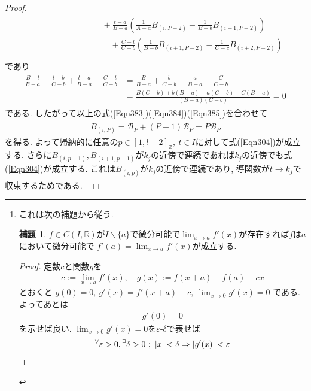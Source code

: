 \documentclass{jsarticle}
\newcommand\setZ{\mathbb{Z}}
\newcommand\Pare[1]{\left(#1\right)}
\newcommand\E[1]{\!\,{\vphantom{#1}}^\exists #1}
\newcommand\A[1]{\!\,{\vphantom{#1}}^\forall #1}
\theoremstyle{definition}%
\newtheorem*{lem*}{補題}
\begin{document}
\begin{proof}
\begin{align}
\begin{aligned}
			&\hspace{7em}\quad+\frac{t-a}{B-a}\Pare{\frac{1}{A-a}B_{(i,P-2)}-\frac{1}{B-b}B_{(i+1,P-2)}} \\
			&\hspace{7em}\qquad+\frac{C-t}{C-b}\Pare{\frac{1}{B-b}B_{(i+1,P-2)}-\frac{1}{C-c}B_{(i+2,P-2)}} \\
		\end{aligned}
	\end{align}
	であり
	\begin{align}
		\label{Eqn385}
		\begin{aligned}
			\frac{B-t}{B-a}-\frac{t-b}{C-b}+\frac{t-a}{B-a}-\frac{C-t}{C-b}
			&=\frac{B}{B-a}+\frac{b}{C-b}-\frac{a}{B-a}-\frac{C}{C-b} \\
			&=\frac{B(C-b)+b(B-a)-a(C-b)-C(B-a)}{(B-a)(C-b)}=0
		\end{aligned}
	\end{align}
	である.
	したがって以上の式(\ref{Eqn383})(\ref{Eqn384})(\ref{Eqn385})を合わせて
	\begin{align}
		\dot{B}_{(i,P)}=\mathcal{B}_P+(P-1)\mathcal{B}_P=P\mathcal{B}_P
	\end{align}
	を得る.
	よって帰納的に任意の${p}\in[1,l-2]_\setZ, \ {t} \in I$に対して式(\ref{Eqn304})が成立する.
	さらに$B_{(i,p-1)}, B_{(i+1,p-1)}$が$k_j$の近傍で連続であれば$k_j$の近傍でも式(\ref{Eqn304})が成立する.
	これは$B_{(i,p)}$が$k_j$の近傍で連続であり, 導関数が$t\to k_j$で収束するためである.%
	\footnote{これは次の補題から従う.
	\begin{lem*}
	    $f\in C(I,\mathbb{R})$が$I\backslash \{a\}$で微分可能で$\displaystyle\lim_{x\to a} f'(x)$が存在すれば$f$は$a$において微分可能で
	    $\displaystyle f'(a)=\lim_{x\to a}f'(x)$が成立する.
	\end{lem*}
	\begin{proof}
	    定数$c$と関数$g$を
	    \begin{align}
	        c:=\lim_{x\to a}f'(x),\quad
	        g(x):=f(x+a)-f(a)-cx
	    \end{align}
	    とおくと
	    $
	        \displaystyle
	        g(0)=0,\
	        g'(x)=f'(x+a)-c,\
	        \lim_{x \to 0} g'(x)=0
	    $
	    である.
	    よってあとは
	    \begin{align}
	        g'(0)=0
	    \end{align}
	    を示せば良い.
	    $\displaystyle \lim_{x\to 0}g'(x)=0$を$\varepsilon$-$\delta$で表せば
	    \begin{align}
	        \A \varepsilon>0, \E \delta>0 \ ; \ |x|<\delta\Rightarrow |g'(x)|<\varepsilon

\end{align}
\end{proof}}
\end{proof}
\end{document}
